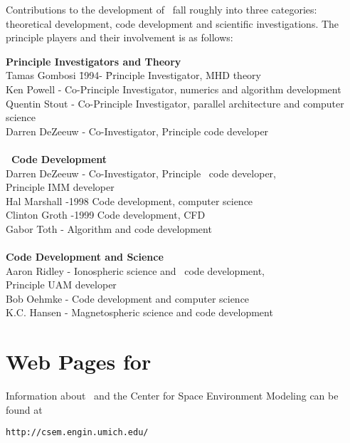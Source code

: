 Contributions to the development of \BATSRUS\ fall roughly into three
categories: theoretical development, code development and scientific
investigations.   The principle players and their involvement is as follows:

\begin{tabbing}
{\bf Principle Investigators and Theory} \\
Tamas Gombosi \hspace{.25in} \= 1994- \hspace{0.35in} \= 
                          Principle Investigator, MHD theory \\
Ken Powell     -     \> Co-Principle Investigator, numerics and algorithm development \\
Quentin Stout  -     \> Co-Principle Investigator, 
                          parallel architecture and computer science \\
Darren DeZeeuw -     \> Co-Investigator, Principle code developer \\
\> \> \\
{\bf \BATSRUS\ Code Development} \\
Darren DeZeeuw -     \> Co-Investigator, Principle \BATSRUS\ code developer, \\
               \>           \> Principle IMM developer  \\
Hal Marshall   -1998 \> Code development, computer science \\
Clinton Groth  -1999 \> Code development, CFD \\ 
Gabor Toth     -     \> Algorithm and code development \\
\> \> \\
{\bf Code Development and Science} \\
Aaron Ridley   -     \> Ionospheric science and \BATSRUS\ code development,\\
               \>           \> Principle UAM developer \\
Bob Oehmke     -     \> Code development and computer science \\
K.C. Hansen    -     \> Magnetospheric science and code development
\end{tabbing}


\section{Web Pages for \BATSRUS}
Information about \BATSRUS\ and the Center for Space Environment Modeling
can be found at
\begin{verbatim}
http://csem.engin.umich.edu/
\end{verbatim}
